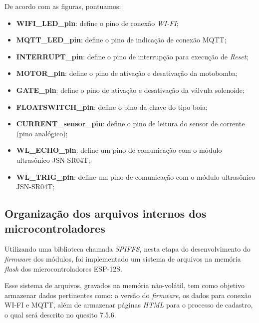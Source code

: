 De acordo com as figuras, pontuamos:

\begin{itemize}
	\item \textbf{WIFI\_LED\_pin}: define o pino de conexão \textit{WI-FI};
	\item \textbf{MQTT\_LED\_pin}: define o pino de indicação de conexão MQTT;
	\item \textbf{INTERRUPT\_pin}: define o pino de interrupção para execução de \textit{Reset};
	\item \textbf{MOTOR\_pin}: define o pino de ativação e desativação da motobomba;
	\item \textbf{GATE\_pin}: define o pino de ativação e desativação da válvula solenoide;
	\item \textbf{FLOATSWITCH\_pin}: define o pino da chave do tipo boia;
	\item \textbf{CURRENT\_sensor\_pin}: define o pino de leitura do sensor de corrente (pino analógico);
	\item \textbf{WL\_ECHO\_pin}: define um pino de comunicação com o módulo ultrasônico JSN-SR04T;
	\item \textbf{WL\_TRIG\_pin}: define um pino de comunicação com o módulo ultrasônico JSN-SR04T; 
\end{itemize}


\subsection{Organização dos arquivos internos dos microcontroladores}

Utilizando uma biblioteca chamada \textit{SPIFFS}, nesta etapa do desenvolvimento do \textit{firmware} dos módulos, foi implementado um sistema de arquivos na memória \textit{flash} dos microcontroladores ESP-12S. 

Esse sistema de arquivos, gravados na memória não-volátil, tem como objetivo armazenar dados pertinentes como: a versão do \textit{firmware}, os dados para conexão WI-FI e MQTT, além de armazenar páginas \textit{HTML} para o processo de cadastro, o qual será descrito no quesito 7.5.6.


